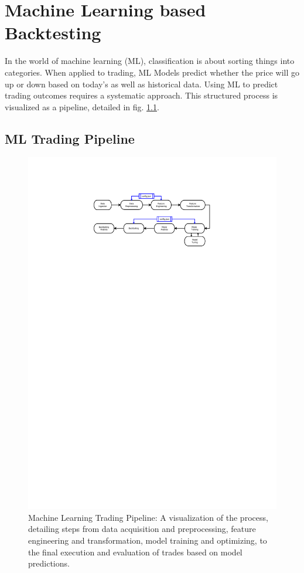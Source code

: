 \chapter{Machine Learning based Backtesting}

In the world of machine learning (ML), classification is about sorting things into categories. When applied to trading, ML Models predict whether the price will go up or down based on today's as well as historical data.
Using ML to predict trading outcomes requires a systematic approach.
This structured process is visualized as a pipeline, detailed in fig. \ref{fig:ml_pipeline}.

\section{ML Trading Pipeline}


\begin{figure}[H]
\centering
\includegraphics[trim=25mm 220mm 55mm 30mm, width=1.2\textwidth, clip]{./pdf/ml_pipeline.pdf}
\caption{Machine Learning Trading Pipeline: A visualization of the process, detailing steps from data acquisition and preprocessing, feature engineering and transformation, model training and optimizing, to the final execution and evaluation of trades based on model predictions.}
\label{fig:ml_pipeline}
\end{figure}

